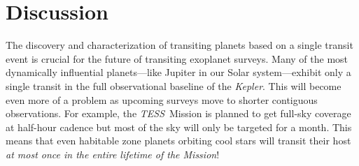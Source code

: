 \documentclass[12pt,preprint]{aastex}
\newcommand{\project}[1]{\textsl{#1}}
\newcommand{\kepler}{\project{Kepler}}
\newcommand{\tess}{\project{TESS}}
\renewcommand{\eqref}[1]{\ref{eq:#1}}
\newcommand{\sectlabel}[1]{\label{sect:#1}}
\newcommand{\dd}{\ensuremath{\,\mathrm{d}}}
\newcommand{\period}{{\ensuremath{P}}}
\newcommand{\rp}{{\ensuremath{R_\mathrm{P}}}}
\newcommand{\rate}{{\ensuremath{\Gamma}}}
\begin{document}


\section{Discussion}\sectlabel{discussion}

The discovery and characterization of transiting planets based on a single
transit event is crucial for the future of transiting exoplanet surveys.
Many of the most dynamically influential planets---like Jupiter in our Solar
system---exhibit only a single transit in the full observational baseline of
the \kepler.
This will become even more of a problem as upcoming surveys move to shorter
contiguous observations.
For example, the \tess\ Mission is planned to get full-sky coverage at
half-hour cadence but most of the sky will only be targeted for a month.
This means that even habitable zone planets orbiting cool stars will transit
their host \emph{at most once in the entire lifetime of the Mission}!
\end{document}
